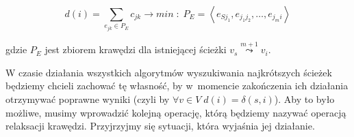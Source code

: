 \begin{equation}
d \left( i \right) = \sum_{e_{jk} \in P_{E}} c_{jk} \rightarrow min\; : \; P_{E} = \left \langle e_{Sj_{1}}, e_{j_{1} j_{2}}, \ldots, e_{j_{m} i } \right \rangle
\end{equation}

gdzie $P_{E}$ jest zbiorem krawędzi dla istniejącej ścieżki $v_{s} \overset{m+1}\leadsto v_{i}$.

W czasie działania wszystkich algorytmów wyszukiwania najkrótszych ścieżek będziemy chcieli zachować tę własność, by w~momencie zakończenia ich działania otrzymywać poprawne wyniki (czyli by $\forall v \in V \; d \left( i \right) = \delta \left( s, i \right)$). Aby to było możliwe, musimy wprowadzić kolejną operację, którą będziemy nazywać operacją relaksacji krawędzi. Przyjrzyjmy się sytuacji, która wyjaśnia jej działanie.

